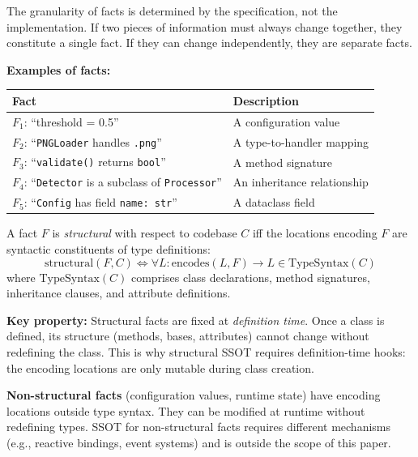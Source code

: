The granularity of facts is determined by the specification, not the implementation. If two pieces of information must always change together, they constitute a single fact. If they can change independently, they are separate facts.

\noindent\textbf{Examples of facts:}

\begin{center}
\begin{tabular}{lp{8cm}}
\toprule
\textbf{Fact} & \textbf{Description} \\
\midrule
$F_1$: ``threshold = 0.5'' & A configuration value \\
$F_2$: ``\texttt{PNGLoader} handles \texttt{.png}'' & A type-to-handler mapping \\
$F_3$: ``\texttt{validate()} returns \texttt{bool}'' & A method signature \\
$F_4$: ``\texttt{Detector} is a subclass of \texttt{Processor}'' & An inheritance relationship \\
$F_5$: ``\texttt{Config} has field \texttt{name: str}'' & A dataclass field \\
\bottomrule
\end{tabular}
\end{center}

\begin{definition}\label{def:structural-fact}
A fact $F$ is \emph{structural} with respect to codebase $C$ iff the locations encoding $F$ are syntactic constituents of type definitions:
\[
\text{structural}(F, C) \Longleftrightarrow \forall L: \text{encodes}(L, F) \rightarrow L \in \text{TypeSyntax}(C)
\]
where $\text{TypeSyntax}(C)$ comprises class declarations, method signatures, inheritance clauses, and attribute definitions.
\end{definition}

\textbf{Key property:} Structural facts are fixed at \emph{definition time}. Once a class is defined, its structure (methods, bases, attributes) cannot change without redefining the class. This is why structural SSOT requires definition-time hooks: the encoding locations are only mutable during class creation.

\textbf{Non-structural facts} (configuration values, runtime state) have encoding locations outside type syntax. They can be modified at runtime without redefining types. SSOT for non-structural facts requires different mechanisms (e.g., reactive bindings, event systems) and is outside the scope of this paper.

